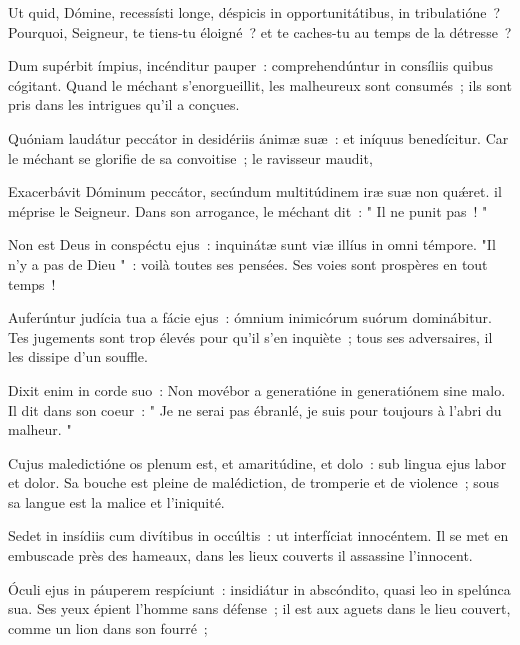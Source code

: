 \begin{paracol}{2}

    \LigneParacol{0cm}
    {Ut quid, Dómine, recessísti longe, \GreStar{} déspicis in opportunitátibus, in tribulatióne~?}
    {Pourquoi, Seigneur, te tiens-tu éloigné~? et te caches-tu au temps de la détresse~? }

    \LigneParacol{0.2cm}
    {Dum supérbit ímpius, incénditur pauper~: \GreStar{} comprehendúntur in consíliis quibus cógitant.}
    {Quand le méchant s'enorgueillit, les malheureux sont consumés~; ils sont pris dans les intrigues qu'il a conçues. }

    \LigneParacol{0.2cm}
    {Quóniam laudátur peccátor in desidériis ánimæ suæ~: \GreStar{} et iníquus benedícitur.}
    {Car le méchant se glorifie de sa convoitise~; le ravisseur maudit,}

    \LigneParacol{0.2cm}
    {Exacerbávit Dóminum peccátor, \GreStar{} secúndum multitúdinem iræ suæ non quǽret.}
    {il méprise le Seigneur. Dans son arrogance, le méchant dit~: " Il ne punit pas~! "}

    \LigneParacol{0.2cm}
    {Non est Deus in conspéctu ejus~: \GreStar{} inquinátæ sunt viæ illíus in omni témpore.}
    {"Il n'y a pas de Dieu "~: voilà toutes ses pensées. Ses voies sont prospères en tout temps~!}

    \LigneParacol{0.2cm}
    {Auferúntur judícia tua a fácie ejus~: \GreStar{} ómnium inimicórum suórum dominábitur.}
    {Tes jugements sont trop élevés pour qu'il s'en inquiète~; tous ses adversaires, il les dissipe d'un souffle. }

    \LigneParacol{0.2cm}
    {Dixit enim in corde suo~: \GreStar{} Non movébor a generatióne in generatiónem sine malo.}
    {Il dit dans son coeur~: " Je ne serai pas ébranlé, je suis pour toujours à l'abri du malheur. " }

    \LigneParacol{0.2cm}
    {Cujus maledictióne os plenum est, et amaritúdine, et dolo~: \GreStar{} sub lingua ejus labor et dolor.}
    {Sa bouche est pleine de malédiction, de tromperie et de violence~; sous sa langue est la malice et l'iniquité. }

    \LigneParacol{0.2cm}
    {Sedet in insídiis cum divítibus in occúltis~: \GreStar{} ut interfíciat innocéntem.}
    {Il se met en embuscade près des hameaux, dans les lieux couverts il assassine l'innocent.}

    \LigneParacol{0.2cm}
    {Óculi ejus in páuperem respíciunt~: \GreStar{} insidiátur in abscóndito, quasi leo in spelúnca sua.}
    {Ses yeux épient l'homme sans défense~; il est aux aguets dans le lieu couvert, comme un lion dans son fourré~;}


\end{paracol}
